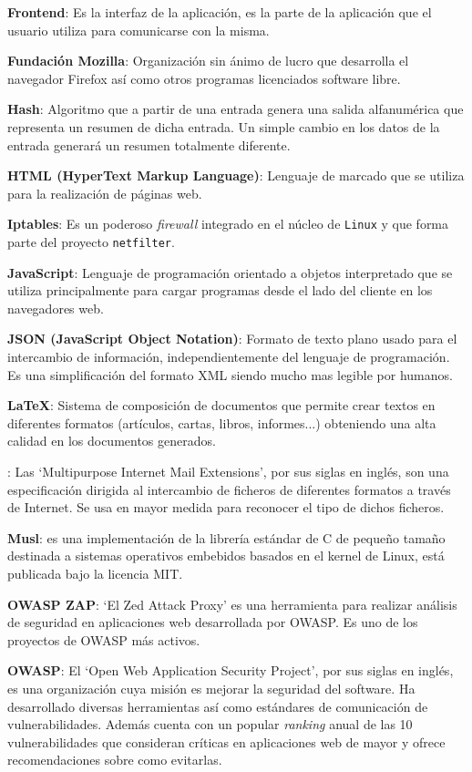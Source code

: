 \textbf{Frontend}: Es la interfaz de la aplicación, es la parte de la aplicación que el usuario utiliza para comunicarse con la misma.
\bigskip

\textbf{Fundación Mozilla}: Organización sin ánimo de lucro que desarrolla el navegador Firefox así como otros programas licenciados software libre.
\bigskip

\textbf{Hash}: Algoritmo que a partir de una entrada genera una salida alfanumérica que representa un resumen de dicha entrada. Un simple cambio en los datos de la entrada generará un resumen totalmente diferente.
\bigskip

\textbf{HTML (HyperText Markup Language)}: Lenguaje de marcado que se utiliza para la realización de páginas web.
\bigskip

\textbf{Iptables}: Es un poderoso \textit{firewall} integrado en el núcleo de \texttt{Linux} y que forma parte del proyecto \texttt{netfilter}.
\bigskip

\textbf{JavaScript}: Lenguaje de programación orientado a objetos interpretado que se utiliza principalmente para cargar programas desde el lado del cliente en los navegadores web.
\bigskip

\textbf{JSON (JavaScript Object Notation)}: Formato de texto plano usado para el intercambio de información, independientemente del lenguaje de programación. Es una simplificación del formato XML siendo mucho mas legible por humanos.
\bigskip

\textbf{LaTeX}: Sistema de composición de documentos que permite crear textos en diferentes formatos (artículos, cartas, libros, informes...) obteniendo una alta calidad en los documentos generados.
\bigskip

: Las `Multipurpose Internet Mail Extensions', por sus siglas en inglés, son una especificación dirigida al intercambio de ficheros de diferentes formatos a través de Internet. Se usa en mayor medida para reconocer el tipo de dichos ficheros.
\bigskip

\textbf{Musl}: es una implementación de la librería estándar de C de pequeño tamaño destinada a sistemas operativos embebidos basados en el kernel de Linux, está publicada bajo la licencia MIT.
\bigskip

\textbf{OWASP ZAP}: `El Zed Attack Proxy' es una herramienta para realizar análisis de seguridad en aplicaciones web desarrollada por OWASP. Es uno de los proyectos de OWASP más activos.
\bigskip

\textbf{OWASP}: El `Open Web Application Security Project', por sus siglas en inglés, es una organización cuya misión es mejorar la seguridad del software. Ha desarrollado diversas herramientas así como estándares de comunicación de vulnerabilidades. Además cuenta con un popular \textit{ranking} anual de las 10 vulnerabilidades que consideran críticas en aplicaciones web de mayor y ofrece recomendaciones sobre como evitarlas.
\bigskip

